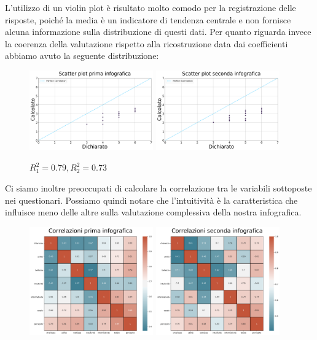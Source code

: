 \documentclass[10pt, a4paper,openany]{article}
\begin{document}
L'utilizzo di un violin plot è risultato molto comodo per la registrazione delle risposte, poiché la media è un indicatore di tendenza centrale e non fornisce alcuna informazione sulla distribuzione di questi dati.
Per quanto riguarda invece la coerenza della valutazione rispetto alla ricostruzione data dai coefficienti abbiamo avuto la seguente distribuzione:
\begin{figure}[H]
   \includegraphics[width=0.475\textwidth]{../quality/risposte_scatter_plot_first.png}
   \hfill
   \includegraphics[width=0.475\textwidth]{../quality/risposte_scatter_plot_second.png}
   \caption{$R_1^2 = 0.79, R_2^2 = 0.73$}
\end{figure}

Ci siamo inoltre preoccupati di calcolare la correlazione tra le variabili sottoposte nei questionari. Possiamo quindi notare che l'intuitività è la caratteristica che influisce meno delle altre sulla valutazione complessiva della nostra infografica.
\begin{figure}[H]
   \includegraphics[width=0.475\textwidth]{../quality/risposte_correlation_plot_first.png}
   \hfill
   \includegraphics[width=0.475\textwidth]{../quality/risposte_correlation_plot_second.png}
\end{figure}
\end{document}
